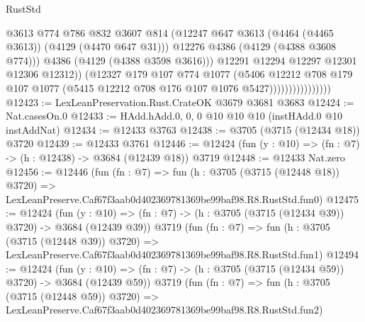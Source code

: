 \begin{lexlean}{RustStd}
\begin{coremodule}
                                      @3613
                                      @774
                                      @786
                                      @832
                                      @3607
                                      @814
                                      (@12247
                                        @647
                                        @3613
                                        (@4464 (@4465 @3613))
                                        (@4129 (@4470 @647 @31)))
                                      @12276
                                      @4386
                                      (@4129 (@4388 @3608 @774)))
                                    @4386
                                    (@4129 (@4388 @3598 @3616)))
                                  @12291
                                  @12294
                                  @12297
                                  @12301
                                  @12306
                                  @12312))
                              (@12327
                                @179
                                @107
                                @774
                                @1077
                                (@5406
                                  @12212
                                  @708
                                  @179
                                  @107
                                  @1077
                                  (@5415 @12212 @708 @176 @107 @1076 @5427))))))))))))))))
@12423 := LexLeanPreservation.Rust.CrateOK @3679 @3681 @3683
@12424 := Nat.casesOn.{0}
@12433 := HAdd.hAdd.{0, 0, 0} @10 @10 @10 (instHAdd.{0} @10 instAddNat)
@12434 := @12433 @3763
@12438 := @3705 (@3715 (@12434 @18)) @3720
@12439 := @12433 @3761
@12446 := @12424 (fun (y : @10) => (fn : @7) -> (h : @12438) -> @3684 (@12439 @18)) @3719
@12448 := @12433 Nat.zero
@12456 := @12446
    (fun (fn : @7) =>
    fun (h : @3705 (@3715 (@12448 @18)) @3720) =>
    LexLeanPreserve.Caf67f3aab0d402369781369be99baf98.R8.RustStd.fun0)
@12475 := @12424
    (fun (y : @10) => (fn : @7) -> (h : @3705 (@3715 (@12434 @39)) @3720) -> @3684 (@12439 @39))
    @3719
    (fun (fn : @7) =>
    fun (h : @3705 (@3715 (@12448 @39)) @3720) =>
    LexLeanPreserve.Caf67f3aab0d402369781369be99baf98.R8.RustStd.fun1)
@12494 := @12424
    (fun (y : @10) => (fn : @7) -> (h : @3705 (@3715 (@12434 @59)) @3720) -> @3684 (@12439 @59))
    @3719
    (fun (fn : @7) =>
    fun (h : @3705 (@3715 (@12448 @59)) @3720) =>
    LexLeanPreserve.Caf67f3aab0d402369781369be99baf98.R8.RustStd.fun2)

\end{coremodule}
\end{lexlean}
